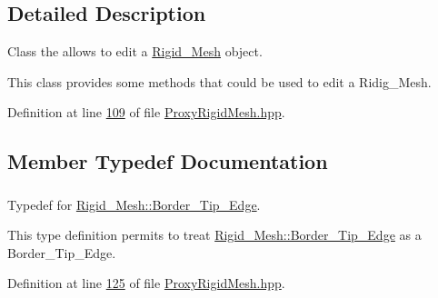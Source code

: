 \subsection{Detailed Description}
Class the allows to edit a \hyperlink{classFVCode3D_1_1Rigid__Mesh}{Rigid\+\_\+\+Mesh} object. 

This class provides some methods that could be used to edit a Ridig\+\_\+\+Mesh. 

Definition at line \hyperlink{ProxyRigidMesh_8hpp_source_l00109}{109} of file \hyperlink{ProxyRigidMesh_8hpp_source}{Proxy\+Rigid\+Mesh.\+hpp}.



\subsection{Member Typedef Documentation}
\subsubsection[{\texorpdfstring{Border\+\_\+\+Tip\+\_\+\+Edge}{Border_Tip_Edge}}]{}\hypertarget{classFVCode3D_1_1ProxyRigidMesh_ac258bca2012a705cb98f8b5038df0ced}{}\label{classFVCode3D_1_1ProxyRigidMesh_ac258bca2012a705cb98f8b5038df0ced}


Typedef for \hyperlink{classFVCode3D_1_1Rigid__Mesh_1_1Border__Tip__Edge}{Rigid\+\_\+\+Mesh\+::\+Border\+\_\+\+Tip\+\_\+\+Edge}. 

This type definition permits to treat \hyperlink{classFVCode3D_1_1Rigid__Mesh_1_1Border__Tip__Edge}{Rigid\+\_\+\+Mesh\+::\+Border\+\_\+\+Tip\+\_\+\+Edge} as a Border\+\_\+\+Tip\+\_\+\+Edge. 

Definition at line \hyperlink{ProxyRigidMesh_8hpp_source_l00125}{125} of file \hyperlink{ProxyRigidMesh_8hpp_source}{Proxy\+Rigid\+Mesh.\+hpp}.

\subsubsection[{\texorpdfstring{Edge}{Edge}}]{}\hypertarget{classFVCode3D_1_1ProxyRigidMesh_a15817669a6e426610648e6b5c9df3773}{}\label{classFVCode3D_1_1ProxyRigidMesh_a15817669a6e426610648e6b5c9df3773}


